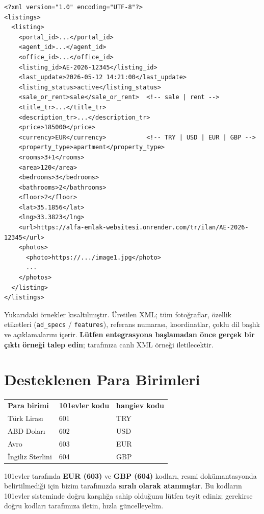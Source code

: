 \documentclass[11pt,a4paper]{article}
\begin{document}
\begin{lstlisting}[style=xmlstyle]
<?xml version="1.0" encoding="UTF-8"?>
<listings>
  <listing>
    <portal_id>...</portal_id>
    <agent_id>...</agent_id>
    <office_id>...</office_id>
    <listing_id>AE-2026-12345</listing_id>
    <last_update>2026-05-12 14:21:00</last_update>
    <listing_status>active</listing_status>
    <sale_or_rent>sale</sale_or_rent>  <!-- sale | rent -->
    <title_tr>...</title_tr>
    <description_tr>...</description_tr>
    <price>185000</price>
    <currency>EUR</currency>           <!-- TRY | USD | EUR | GBP -->
    <property_type>apartment</property_type>
    <rooms>3+1</rooms>
    <area>120</area>
    <bedrooms>3</bedrooms>
    <bathrooms>2</bathrooms>
    <floor>2</floor>
    <lat>35.1856</lat>
    <lng>33.3823</lng>
    <url>https://alfa-emlak-websitesi.onrender.com/tr/ilan/AE-2026-12345</url>
    <photos>
      <photo>https://.../image1.jpg</photo>
      ...
    </photos>
  </listing>
</listings>
\end{lstlisting}

\begin{infobox}
Yukarıdaki örnekler kısaltılmıştır. Üretilen XML; tüm fotoğraflar, özellik etiketleri (\texttt{ad\_specs} / \texttt{features}), referans numarası, koordinatlar, çoklu dil başlık ve açıklamalarını içerir. \textbf{Lütfen entegrasyona başlamadan önce gerçek bir çıktı örneği talep edin}; tarafınıza canlı XML örneği iletilecektir.
\end{infobox}

\section{Desteklenen Para Birimleri}

\begin{tabular}{lll}
\textbf{Para birimi} & \textbf{101evler kodu} & \textbf{hangiev kodu} \\
Türk Lirası & 601 & TRY \\
ABD Doları & 602 & USD \\
Avro & 603 & EUR \\
İngiliz Sterlini & 604 & GBP \\
\end{tabular}

\begin{warnbox}
101evler tarafında \textbf{EUR (603)} ve \textbf{GBP (604)} kodları, resmi dokümantasyonda belirtilmediği için bizim tarafımızda \textbf{sıralı olarak atanmıştır}. Bu kodların 101evler sisteminde doğru karşılığa sahip olduğunu lütfen teyit ediniz; gerekirse doğru kodları tarafımıza iletin, hızla güncelleyelim.
\end{warnbox}
\end{document}
